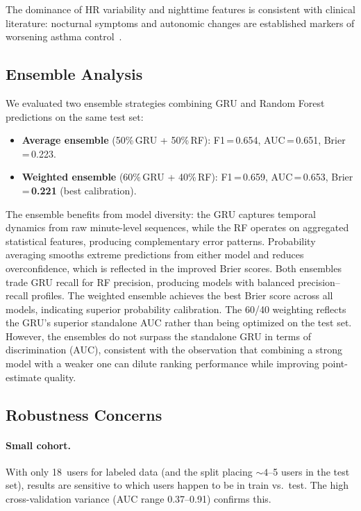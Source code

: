 \documentclass[11pt,a4paper]{article}
\begin{document}
The dominance of HR variability and nighttime features is consistent with
clinical literature: nocturnal symptoms and autonomic changes are established
markers of worsening asthma control~\cite{bourdin2019}.

\subsection{Ensemble Analysis}

We evaluated two ensemble strategies combining GRU and Random Forest
predictions on the same test set:

\begin{itemize}[nosep]
  \item \textbf{Average ensemble} (50\%\,GRU + 50\%\,RF): F1\,=\,0.654,
        AUC\,=\,0.651, Brier\,=\,0.223.
  \item \textbf{Weighted ensemble} (60\%\,GRU + 40\%\,RF): F1\,=\,0.659,
        AUC\,=\,0.653, Brier\,=\,\textbf{0.221} (best calibration).
\end{itemize}

The ensemble benefits from model diversity: the GRU captures temporal
dynamics from raw minute-level sequences, while the RF operates on aggregated
statistical features, producing complementary error patterns.  Probability
averaging smooths extreme predictions from either model and reduces
overconfidence, which is reflected in the improved Brier scores.
Both ensembles trade GRU recall for RF precision, producing models with
balanced precision–recall profiles.  The weighted ensemble achieves the best
Brier score across all models, indicating superior probability calibration.
The 60/40 weighting reflects the GRU's superior standalone AUC rather than
being optimized on the test set.  However, the ensembles do not surpass the
standalone GRU in terms of discrimination (AUC), consistent with the
observation that combining a strong model with a weaker one can dilute ranking
performance while improving point-estimate quality.

\subsection{Robustness Concerns}

\paragraph{Small cohort.}
With only 18~users for labeled data (and the split placing ${\sim}4$--5 users
in the test set), results are sensitive to which users happen to be in train
vs.\ test.  The high cross-validation variance (AUC range 0.37--0.91) confirms
this.
\end{document}
